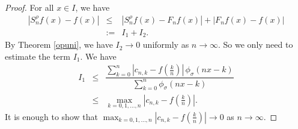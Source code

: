 \documentclass[12pt, reqno]{amsart}
\numberwithin{equation}{section}
\theoremstyle{definition}
\theoremstyle{remark}
\numberwithin{equation}{section}
\begin{document}
\begin{proof} For all $x\in I$, we have
\begin{eqnarray*}
|S^{\rho}_nf(x)-f(x)|
&\leq& |S^{\rho}_nf(x)-F_nf(x)| + |F_nf(x)-f(x)|\\
&:=& I_1 + I_2.
\end{eqnarray*}
    By Theorem \ref{opuni}, we have $I_2\to 0$ uniformly as $n\to\infty.$ So we only need to estimate the term $I_1.$ We have 
\begin{eqnarray*}
I_1 %
&\leq& \dfrac{\displaystyle{\sum_{k=0}^{n}}\left|c_{n,k}-f\left(\frac{k}{n}\right)\right|\,\phi_\sigma(nx-k)}{\sum_{k=0}^{n}\phi_\sigma(nx-k)} \\
&\leq& \max_{k=0,1,\ldots,n}\left|c_{n,k}-f\left(\frac{k}{n}\right)\right|.
\end{eqnarray*}
It is enough to show that $\max_{k=0,1,\ldots,n}\left|c_{n,k}-f\left(\frac{k}{n}\right)\right|\to0$ as $n\to\infty.$ 


\end{proof}
\end{document}
